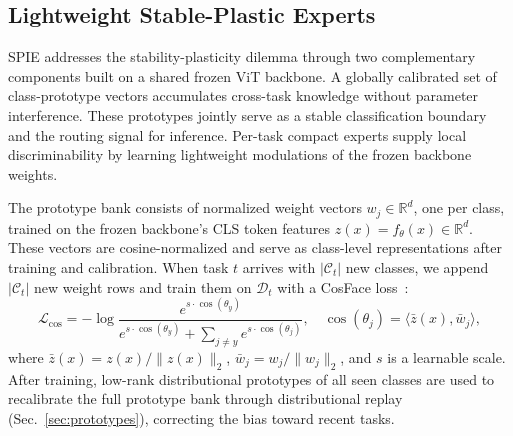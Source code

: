 \subsection{Lightweight Stable-Plastic Experts}
\label{sec:experts}

SPIE addresses the stability-plasticity dilemma through two complementary components built on a shared frozen ViT backbone. A globally calibrated set of class-prototype vectors accumulates cross-task knowledge without parameter interference. These prototypes jointly serve as a stable classification boundary and the routing signal for inference. Per-task compact experts supply local discriminability by learning lightweight modulations of the frozen backbone weights.

The prototype bank consists of normalized weight vectors $w_j \in \mathbb{R}^d$, one per class, trained on the frozen backbone's CLS token features $z(x) = f_\theta(x) \in \mathbb{R}^{d}$. These vectors are cosine-normalized and serve as class-level representations after training and calibration. When task $t$ arrives with $|\mathcal{C}_t|$ new classes, we append $|\mathcal{C}_t|$ new weight rows and train them on $\mathcal{D}_t$ with a CosFace loss~\cite{wang2018cosface}:
\begin{equation}
\mathcal{L}_{\text{cos}} = -\log \frac{e^{s \cdot \cos(\theta_{y})}}{e^{s \cdot \cos(\theta_{y})} + \sum_{j \neq y} e^{s \cdot \cos(\theta_{j})}}, \quad \cos(\theta_j) = \langle \bar{z}(x), \bar{w}_j \rangle,
\label{eq:cosface}
\end{equation}
where $\bar{z}(x) = z(x)/\|z(x)\|_2$, $\bar{w}_j = w_j/\|w_j\|_2$, and $s$ is a learnable scale. After training, low-rank distributional prototypes of all seen classes are used to recalibrate the full prototype bank through distributional replay (Sec.~\ref{sec:prototypes}), correcting the bias toward recent tasks.

